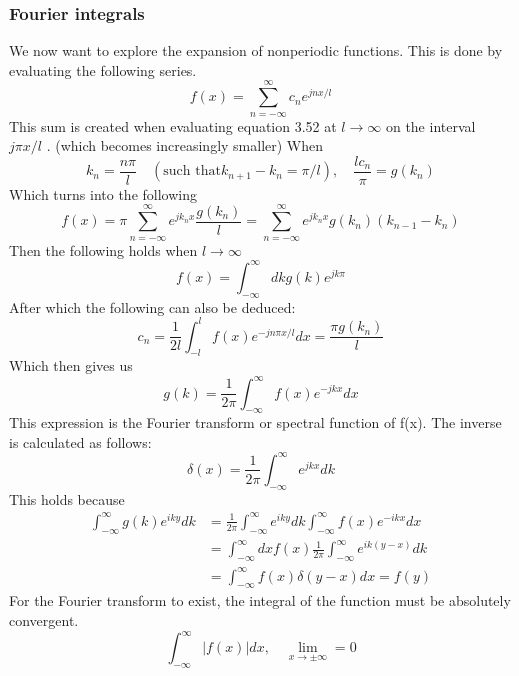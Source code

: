 \subsubsection{Fourier integrals}
We now want to explore the expansion of nonperiodic functions. This is done by evaluating the following series.
\begin{equation}
    f(x) = \sum_{n=-\infty}^{\infty}c_n e^{jnx/l} 
\end{equation}
This sum is created when evaluating equation 3.52 at $l \rightarrow \infty $ on the interval $j \pi x / l$ . (which becomes increasingly smaller)
When
\begin{equation}
    k_n = \frac{n\pi }{l} \quad (\text{such that} k_{n+1} -k_n = \pi /l), \quad \frac{lc_n}{\pi }= g(k_n)
\end{equation}
Which turns into the following
\begin{equation}
    f(x) = \pi \sum_{n=-\infty}^\infty e^{jk_nx}\frac{g(k_n)}{l}= \sum_{n=-\infty}^\infty e^{jk_nx}g(k_n)(k_{n-1}-k_n)
\end{equation}
Then the following holds when $l \rightarrow \infty$
\begin{equation}
    f(x)= \int_{-\infty}^\infty dkg(k)e^{jk\pi}
\end{equation}
After which the following can also be deduced:
\begin{equation}
    c_n = \frac{1}{2l}\int_{-l}^lf(x)e^{-jn\pi x/l} dx = \frac{\pi g(k_n)}{l}
\end{equation}
Which then gives us 
\begin{equation}
    g(k) = \frac{1}{2\pi}\int_{-\infty}^\infty f(x) e^{-jkx}dx
\end{equation}
This expression is the Fourier transform or spectral function of f(x). The inverse is calculated as follows:
\begin{equation}
    \delta(x) = \frac{1}{2\pi} \int_{-\infty}^\infty e^{jkx}dk
\end{equation}
This holds because    
\begin{equation}
    \begin{aligned}
    \int_{-\infty}^{\infty} g(k) e^{i k y} d k &=\frac{1}{2 \pi} \int_{-\infty}^{\infty} e^{i k y} d k \int_{-\infty}^{\infty} f(x) e^{-i k x} d x \\
    &=\int_{-\infty}^{\infty} d x f(x) \frac{1}{2 \pi} \int_{-\infty}^{\infty} e^{i k(y-x)} d k \\
    &=\int_{-\infty}^{\infty} f(x) \delta(y-x) d x=f(y)
\end{aligned}
\end{equation}
For the Fourier transform to exist, the integral of the function must be absolutely convergent.
\begin{equation}
    \int_{-\infty}^\infty |f(x)|dx, \quad \lim_{x \rightarrow \pm \infty} = 0
\end{equation}
